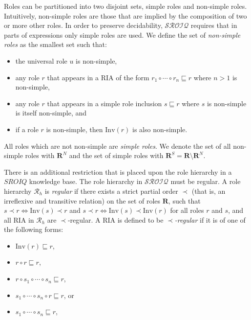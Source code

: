 Roles can be partitioned into two disjoint sets, simple roles and non-simple roles. Intuitively, non-simple roles are those that are implied by the composition of two or more other roles. In order to preserve decidability, $\mathcal{SROIQ}$ requires that in parts of expressions only simple roles are used. We define the set of \emph{non-simple roles} as the smallest set such that:

\begin{itemize}
    \item the universal role $u$ is non-simple,
    \item any role $r$ that appears in a RIA of the form $r_1 \circ \cdots \circ r_n \sqsubseteq r$ where $n > 1$ is non-simple,
    \item any role $r$ that appears in a simple role inclusion $s \sqsubseteq r$ where $s$ is non-simple is itself non-simple, and
    \item if a role $r$ is non-simple, then $\mathrm{Inv}(r)$ is also non-simple.
\end{itemize}

All roles which are not non-simple are \emph{simple roles}. We denote the set of all non-simple roles with $\mathbf{R}^N$ and the set of simple roles with $\mathbf{R}^S = \mathbf{R} \setminus \mathbf{R}^N$.

\begin{example}
\end{example}

There is an additional restriction that is placed upon the role hierarchy in a $SROIQ$ knowledge base. The role hierarchy in $\mathcal{SROIQ}$ must be regular. A role hierarchy $\mathcal{R}_h$ is \emph{regular} if there exists a strict partial order $\prec$ (that is, an irreflexive and transitive relation) on the set of roles $\mathbf{R}$, such that $s \prec r \iff \mathrm{Inv}(s) \prec r$ and $s \prec r \iff \mathrm{Inv}(s) \prec \mathrm{Inv}(r)$ for all roles $r$ and $s$, and all RIA in $\mathcal{R}_h$ are $\prec$-regular. A RIA is defined to be $\prec$\emph{-regular} if it is of one of the following forms:

\begin{itemize}
    \item $\mathrm{Inv}(r) \sqsubseteq r$,
    \item $r \circ r \sqsubseteq r$,
    \item $r \circ s_1 \circ \cdots \circ s_n \sqsubseteq r$,
    \item $s_1 \circ \cdots \circ s_n \circ r \sqsubseteq r$, or
    \item $s_1 \circ \cdots \circ s_n \sqsubseteq r$,
\end{itemize}

